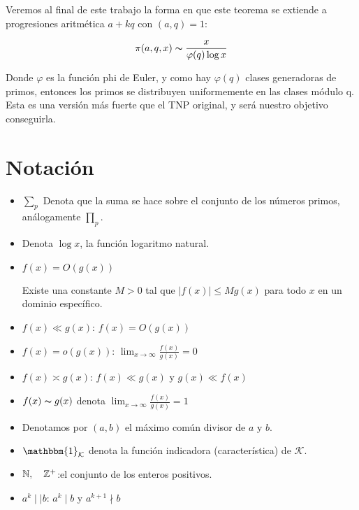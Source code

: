 Veremos al final de este trabajo la forma en que este teorema se extiende a progresiones aritmética $a+kq$ con $(a,q)=1$:

$$\pi(a,q,x)\thicksim \frac{x}{\varphi(q)\log x}$$

Donde $\varphi$ es la función phi de Euler, y como hay $\varphi(q)$ clases generadoras de primos, entonces los primos se distribuyen uniformemente en las clases módulo q. Esta es una versión más fuerte que el TNP original, y será nuestro objetivo conseguirla.


\section*{Notación}

\begin{itemize}[label=$\bullet$]

\item $\displaystyle\sum_p$ Denota que la suma se hace sobre el conjunto de los números primos, análogamente $\displaystyle\prod_p$.

\item Denota $\log x$, la función logaritmo natural.

\item $f(x)=O\left(g(x)\right)$

Existe una constante $M>0$ tal que $|f(x)|\leq Mg(x)$ para todo $x$ en un dominio específico.

\item $f(x)\ll g(x)$: \quad $f(x)=O(g(x))$

\item $f(x)=o(g(x))$: \quad $\displaystyle\lim_{x \to \infty}\frac{f(x)}{g(x)}=0$

\item $f(x)\asymp g(x)$: \quad $f(x)\ll g(x)$ y $g(x)\ll f(x)$

\item $f(x)\thicksim g(x)$ denota $\displaystyle \lim_{x \to \infty} \frac{f(x)}{g(x)}=1$

\item Denotamos por $(a,b)$ el máximo común divisor de $a$ y $b$.

\item $\mathbbm{1}_{\mathcal{K}}$ denota la función indicadora (característica) de $\mathcal{K}$.

\item $\mathbb{N}, \quad \mathbb{Z}^{+}$:\quad el conjunto de los enteros positivos.

\item $a^k\mid\mid b$: \quad $a^k\mid b$ y $a^{k+1}\nmid b$\\
\end{itemize}

